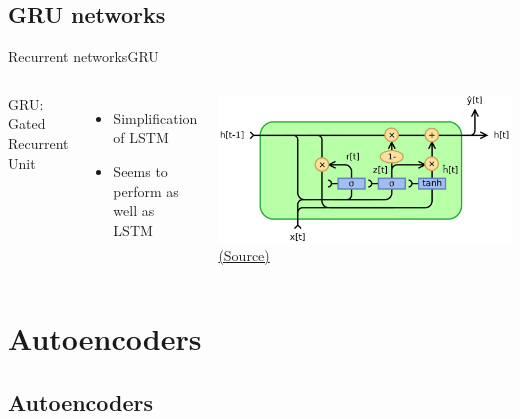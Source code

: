 \documentclass[10pt,compress]{beamer} %
\begin{document}
\subsection{GRU networks}
\begin{frame}{Recurrent networks}{GRU}
    \begin{columns}
            GRU: Gated Recurrent Unit
            \begin{itemize}
                \item Simplification of LSTM
                \item Seems to perform as well as LSTM
            \end{itemize}
            \centering \includegraphics[width=\textwidth]{figs/GRU.png}\\
	        \scriptsize\href{https://en.wikipedia.org/wiki/Gated_recurrent_unit}{(Source)}
    \end{columns}
\end{frame}



\section{Autoencoders}

\subsection{Autoencoders}
\end{document}
